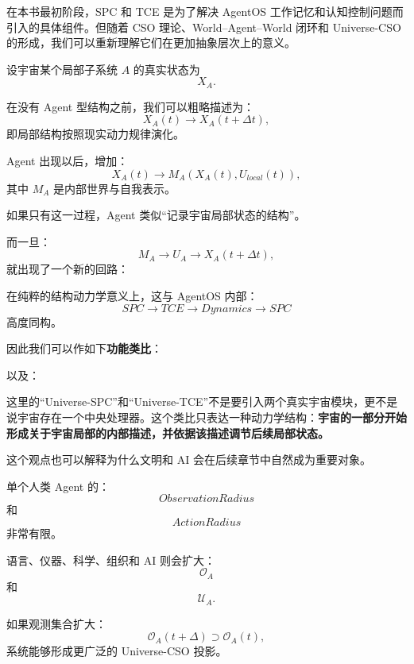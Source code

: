 在本书最初阶段，SPC 和 TCE 是为了解决 AgentOS 工作记忆和认知控制问题而引入的具体组件。但随着 CSO 理论、World--Agent--World 闭环和 Universe-CSO 的形成，我们可以重新理解它们在更加抽象层次上的意义。

设宇宙某个局部子系统 \(A\) 的真实状态为
\[
X_A.
\]

在没有 Agent 型结构之前，我们可以粗略描述为：
\[
X_A(t)
\rightarrow
X_A(t+\Delta t),
\]
即局部结构按照现实动力规律演化。

Agent 出现以后，增加：
\[
X_A(t)
\rightarrow
M_A(X_A(t),U_{local}(t)),
\]
其中 \(M_A\) 是内部世界与自我表示。

如果只有这一过程，Agent 类似“记录宇宙局部状态的结构”。

而一旦：
\[
M_A
\rightarrow
U_A
\rightarrow
X_A(t+\Delta t),
\]
就出现了一个新的回路：
\begin{statementbox}
\centering
{}
\end{statementbox}

在纯粹的结构动力学意义上，这与 AgentOS 内部：
\[
SPC
\rightarrow
TCE
\rightarrow
Dynamics
\rightarrow
SPC
\]
高度同构。

因此我们可以作如下\textbf{功能类比}：
\begin{statementbox}
\centering
{}
\end{statementbox}

以及：
\begin{statementbox}
\centering
{}
\end{statementbox}

这里的“Universe-SPC”和“Universe-TCE”不是要引入两个真实宇宙模块，更不是说宇宙存在一个中央处理器。这个类比只表达一种动力学结构：\textbf{宇宙的一部分开始形成关于宇宙局部的内部描述，并依据该描述调节后续局部状态。}

这个观点也可以解释为什么文明和 AI 会在后续章节中自然成为重要对象。

单个人类 Agent 的：
\[
ObservationRadius
\]
和
\[
ActionRadius
\]
非常有限。

语言、仪器、科学、组织和 AI 则会扩大：
\[
\mathcal O_A
\]
和
\[
\mathcal U_A.
\]

如果观测集合扩大：
\[
\mathcal O_A(t+\Delta)
\supset
\mathcal O_A(t),
\]
系统能够形成更广泛的 Universe-CSO 投影。

